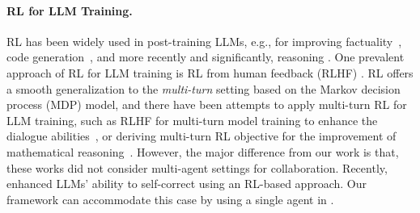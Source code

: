 \paragraph{RL for LLM Training. }
RL has been widely used in post-training  LLMs, e.g., for improving  factuality~\cite{tianfine}, code generation~\cite{le2022coderl}, and more recently and significantly, reasoning \cite{guo2025deepseek}. One prevalent approach of RL for LLM training is RL from human feedback (RLHF) 
\citep{ziegler2019fine, ouyang2022training,bai2022training, ahmadian-etal-2024-back}. 
RL offers a smooth generalization to the {\it multi-turn} setting  based on the Markov decision process (MDP) model, and there have been attempts to apply multi-turn RL for LLM training, such as RLHF for multi-turn model training to enhance the dialogue abilities~\citep{shani2024multi}, or deriving multi-turn RL objective for the improvement of mathematical reasoning~\cite{xiong2024building}. However, the major difference from  our work is that, these works did not consider multi-agent settings for collaboration. Recently, \citet{kumar2024training} enhanced LLMs' ability to self-correct using an RL-based approach. Our framework can accommodate this case by using a single agent in  \ourstwo.